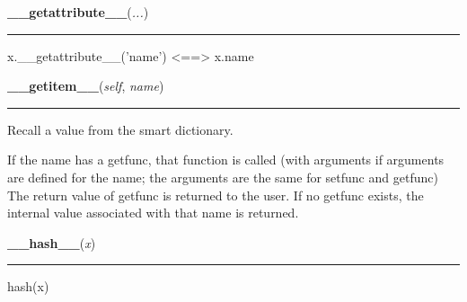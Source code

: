    \label{object:__getattribute__}

    \vspace{0.5ex}

    \begin{boxedminipage}{\textwidth}

    \raggedright \textbf{\_\_getattribute\_\_}(\textit{...})

    \vspace{-1.5ex}

    \rule{\textwidth}{0.5\fboxrule}
    x.\_\_getattribute\_\_('name') {\textless}=={\textgreater} x.name

    \vspace{1ex}

    \end{boxedminipage}

    \label{DataDict:DataDict:__getitem__}

    \vspace{0.5ex}

    \begin{boxedminipage}{\textwidth}

    \raggedright \textbf{\_\_getitem\_\_}(\textit{self}, \textit{name})

    \vspace{-1.5ex}

    \rule{\textwidth}{0.5\fboxrule}
    Recall a value from the smart dictionary.

    If the name has a getfunc, that function is called (with arguments if 
    arguments are defined for the name; the arguments are the same for 
    setfunc and getfunc) The return value of getfunc is returned to the 
    user. If no getfunc exists, the internal value associated with that 
    name is returned.

    \vspace{1ex}

    \end{boxedminipage}

    \label{object:__hash__}

    \vspace{0.5ex}

    \begin{boxedminipage}{\textwidth}

    \raggedright \textbf{\_\_hash\_\_}(\textit{x})

    \vspace{-1.5ex}

    \rule{\textwidth}{0.5\fboxrule}
    hash(x)

    \vspace{1ex}

    \end{boxedminipage}

